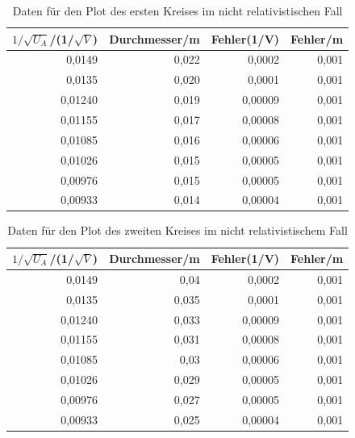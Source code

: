 \documentclass[12pt,a4paper]{article}
\begin{document}
\begin{table}[H]
\caption{Daten für den Plot des ersten Kreises im nicht relativistischen Fall}
\begin{center}
\begin{tabular}{|r|r|r|r|}
\hline
\multicolumn{1}{|l|}{$1/\sqrt{U_A}$/(1/$\sqrt{V}$)} & \multicolumn{1}{l|}{Durchmesser/m} & \multicolumn{1}{l|}{Fehler(1/V)} & \multicolumn{1}{l|}{Fehler/m} \\ \hline
0,0149 & 0,022 & 0,0002 & 0,001 \\ \hline
0,0135 & 0,020 & 0,0001 & 0,001 \\ \hline
0,01240 & 0,019 & 0,00009 & 0,001 \\ \hline
0,01155 & 0,017 & 0,00008 & 0,001 \\ \hline
0,01085 & 0,016 & 0,00006 & 0,001 \\ \hline
0,01026 & 0,015 & 0,00005 & 0,001 \\ \hline
0,00976 & 0,015 & 0,00005 & 0,001 \\ \hline
0,00933 & 0,014 & 0,00004 & 0,001 \\ \hline
\end{tabular}
\end{center}
\label{tab:p_1}
\end{table}

\begin{table}[H]
\caption{Daten für den Plot des zweiten Kreises im nicht relativistischem Fall}
\begin{center}
\begin{tabular}{|r|r|r|r|}
\hline
\multicolumn{1}{|l|}{$1/\sqrt{U_A}$/(1/$\sqrt{V}$)} & \multicolumn{1}{l|}{Durchmesser/m} & \multicolumn{1}{l|}{Fehler(1/V)} & \multicolumn{1}{l|}{Fehler/m} \\ \hline
0,0149 & 0,04 & 0,0002 & 0,001 \\ \hline
0,0135 & 0,035 & 0,0001 & 0,001 \\ \hline
0,01240 & 0,033 & 0,00009 & 0,001 \\ \hline
0,01155 & 0,031 & 0,00008 & 0,001 \\ \hline
0,01085 & 0,03 & 0,00006 & 0,001 \\ \hline
0,01026 & 0,029 & 0,00005 & 0,001 \\ \hline
0,00976 & 0,027 & 0,00005 & 0,001 \\ \hline
0,00933 & 0,025 & 0,00004 & 0,001 \\ \hline
\end{tabular}
\end{center}
\label{tab:p_2}
\end{table}
\end{document}
